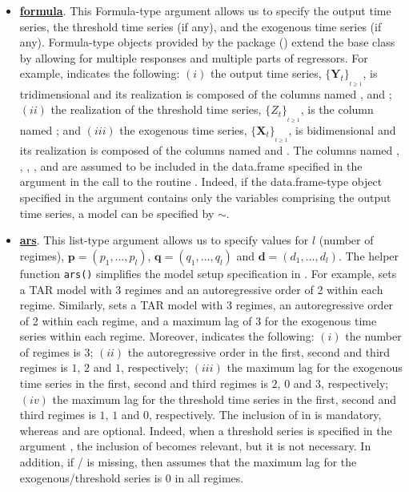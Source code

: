 \begin{itemize}
\item \underline{\bf formula}. This Formula-type argument allows us to specify the output time series, the threshold time series (if any), and the exogenous time series (if any). Formula-type objects provided by the package  (\citet{ZC10}) extend the base class  by allowing for multiple responses and multiple parts of regressors. For example,  indicates the following: $(i)$ the output time series, $\{\bm{Y}_t\}_{_{t\geq 1}}$, is tridimensional and its realization is composed of the columns named ,  and ; $(ii)$ the realization of the threshold time series, $\{Z_t\}_{_{t\geq 1}}$, is the column named ; and $(iii)$ the exogenous time series, $\{\bm{X}_t\}_{_{t\geq 1}}$, is bidimensional and its realization is composed of the columns named  and . The columns named , , , ,  and  are assumed to be included in the data.frame specified in the argument  in the call to the routine . Indeed, if the data.frame-type object specified in the argument  contains only the variables comprising the output time series, a  model can be specified by $\sim .$

\item \underline{\bf ars}. This list-type argument allows us to specify values for $l$ (number of regimes), $\bm{p}=(p_1,\ldots,p_l)$, $\bm{q}=(q_1,\ldots,q_l)$ and $\bm{d}=(d_1,\ldots,d_l)$. The helper function {\tt ars()} simplifies the model setup specification in . For example,  sets a TAR model with 3 regimes and an autoregressive order of 2 within each regime. Similarly,  sets a TAR model with 3 regimes, an autoregressive order of 2 within each regime, and a maximum lag of 3 for the exogenous time series within each regime. Moreover,   indicates the following: $(i)$ the number of regimes is $3$; $(ii)$ the autoregressive order in the first, second and third regimes is $1$, $2$ and $1$, respectively; $(iii)$ the maximum lag for the exogenous time series in the first, second and third regimes is $2$, $0$ and $3$, respectively; $(iv)$ the maximum lag for the threshold time series in the first, second and third regimes is $1$, $1$ and $0$, respectively.  The inclusion of  in   is mandatory, whereas  and  are optional. Indeed, when a threshold series is specified in the argument , the inclusion of  becomes relevant, but it is not necessary. In addition, if / is missing, then  assumes that the maximum lag for the exogenous/threshold series is $0$ in all regimes.


\end{itemize}
